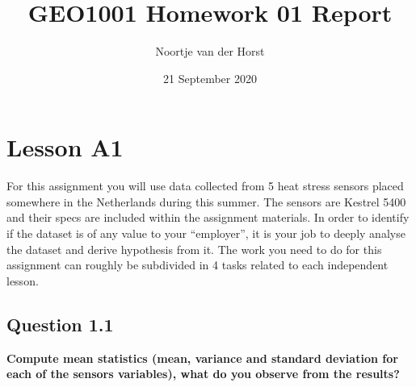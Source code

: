 \documentclass{report}
\title{GEO1001 Homework 01 Report}
\author{Noortje van der Horst}
\date{21 September 2020}
\begin{document}
	
	\maketitle
	
	\section{Lesson A1}
	For this assignment you will use data collected from 5 heat stress sensors placed somewhere in the Netherlands during this summer. The sensors are Kestrel 5400 and their specs are included within the assignment materials. In order to identify if the dataset is of any value to your “employer”, it is your job to deeply analyse the dataset and derive hypothesis from it. The work you need to do for this assignment can roughly be subdivided in 4 tasks related to each independent lesson.
	
	
	\subsection{Question 1.1}
	\textbf{Compute mean statistics (mean, variance and standard deviation for each of the sensors variables), what do you observe from the results?}
	
\end{document}
